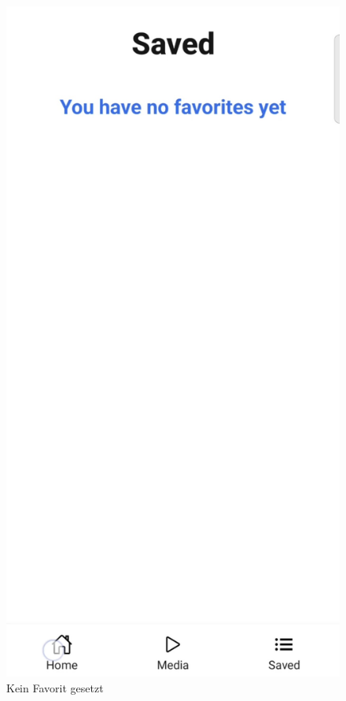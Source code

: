 \begin{figure}[H]
    \begin{minipage}{0.5\textwidth}
        \centering
        \includegraphics[height=2\textwidth]{./pics/No Favoriten.jpg}
        \caption{Kein Favorit gesetzt}

\end{minipage}
\end{figure}
